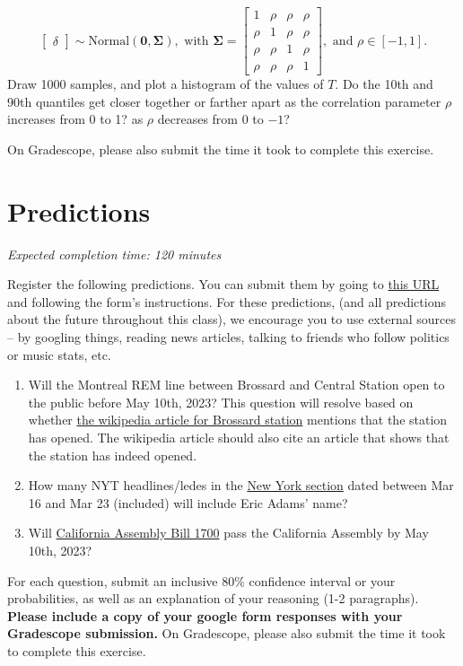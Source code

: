 \documentclass[11pt]{article}
\begin{document}
\begin{enumerate}
$$\begin{bmatrix}
			\delta	
		\end{bmatrix} \sim \text{Normal}(\mathbf{0}, \mathbf{\Sigma}),
		\text{ with }
		\mathbf{\Sigma} = \begin{bmatrix}
				1 & \rho & \rho & \rho\\
				\rho & 1 & \rho & \rho\\
				\rho & \rho & 1 & \rho\\
				\rho & \rho & \rho & 1
			\end{bmatrix},
		\text{ and } \rho \in [-1, 1].
		$$
	Draw 1000 samples, and plot a histogram of the values of $T$. Do the 10th and 90th quantiles get closer together or farther apart as the correlation parameter $\rho$ increases from 0 to 1? as $\rho$ decreases from 0 to $-1$?
\end{enumerate}


On Gradescope, please also submit the time it took to complete this exercise.

\section*{Predictions}

\emph{Expected completion time: 120 minutes} 

Register the following predictions. You can submit them by going to \href{https://docs.google.com/forms/d/1zfza4lPpQWRJDRBghY6a9-HK3erBo32wJBQy-BGfhBA/edit}{this URL} and following the form's instructions. For these predictions, (and all predictions about the future throughout this class), we encourage you to use external sources -- by googling things, reading news articles, talking to friends who follow politics or music stats, etc.

\begin{enumerate}
	\item Will the Montreal REM line between Brossard and Central Station open to the public before May 10th, 2023? This question will resolve based on whether \href{https://en.wikipedia.org/wiki/Brossard_station}{the wikipedia article for Brossard station} mentions that the station has opened. The wikipedia article should also cite an article that shows that the station has indeed opened.
	\item How many NYT headlines/ledes in the \href{https://www.nytimes.com/section/nyregion}{New York section} dated between Mar 16 and Mar 23 (included) will include Eric Adams' name? 
	\item Will \href{https://leginfo.legislature.ca.gov/faces/billNavClient.xhtml?bill_id=202320240AB1700}{California Assembly Bill 1700} pass the California Assembly by May 10th, 2023?
\end{enumerate}

For each question, submit an inclusive 80\% confidence interval or your probabilities, as well as an explanation of your reasoning (1-2 paragraphs). \textbf{Please include a copy of your google form responses with your Gradescope submission.} On Gradescope, please also submit the time it took to complete this exercise.
\end{document}
